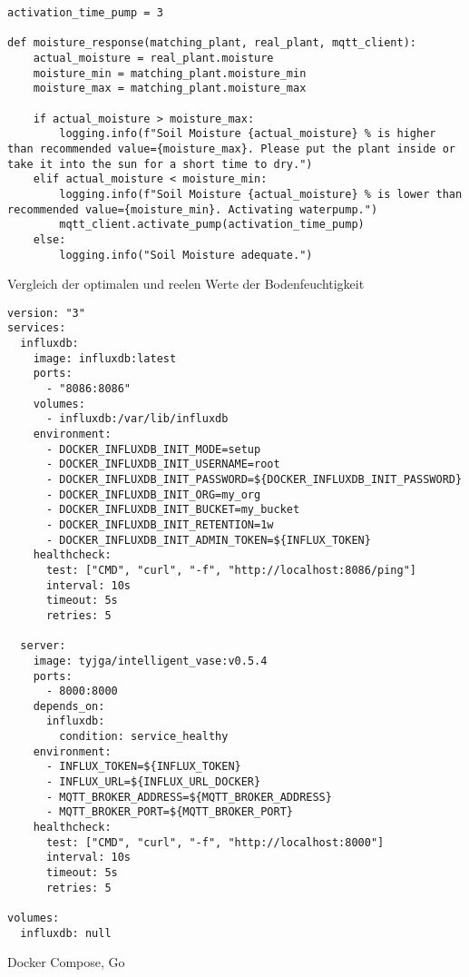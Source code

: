 \begin{longlisting}
\begin{verbatim}
activation_time_pump = 3

def moisture_response(matching_plant, real_plant, mqtt_client):
    actual_moisture = real_plant.moisture
    moisture_min = matching_plant.moisture_min
    moisture_max = matching_plant.moisture_max

    if actual_moisture > moisture_max:
        logging.info(f"Soil Moisture {actual_moisture} % is higher than recommended value={moisture_max}. Please put the plant inside or take it into the sun for a short time to dry.")
    elif actual_moisture < moisture_min:
        logging.info(f"Soil Moisture {actual_moisture} % is lower than recommended value={moisture_min}. Activating waterpump.")
        mqtt_client.activate_pump(activation_time_pump)
    else:
        logging.info("Soil Moisture adequate.")
\end{verbatim}
\caption{Vergleich der optimalen und reelen Werte der Bodenfeuchtigkeit}\label{cde:applicationService}
\end{longlisting}
\newpage

\begin{longlisting}
\begin{verbatim}
version: "3"
services:
  influxdb:
    image: influxdb:latest
    ports:
      - "8086:8086"
    volumes:
      - influxdb:/var/lib/influxdb
    environment:
      - DOCKER_INFLUXDB_INIT_MODE=setup
      - DOCKER_INFLUXDB_INIT_USERNAME=root
      - DOCKER_INFLUXDB_INIT_PASSWORD=${DOCKER_INFLUXDB_INIT_PASSWORD}
      - DOCKER_INFLUXDB_INIT_ORG=my_org
      - DOCKER_INFLUXDB_INIT_BUCKET=my_bucket
      - DOCKER_INFLUXDB_INIT_RETENTION=1w
      - DOCKER_INFLUXDB_INIT_ADMIN_TOKEN=${INFLUX_TOKEN}
    healthcheck:
      test: ["CMD", "curl", "-f", "http://localhost:8086/ping"]
      interval: 10s
      timeout: 5s
      retries: 5

  server:
    image: tyjga/intelligent_vase:v0.5.4
    ports:
      - 8000:8000
    depends_on:
      influxdb:
        condition: service_healthy
    environment:
      - INFLUX_TOKEN=${INFLUX_TOKEN}
      - INFLUX_URL=${INFLUX_URL_DOCKER}
      - MQTT_BROKER_ADDRESS=${MQTT_BROKER_ADDRESS}
      - MQTT_BROKER_PORT=${MQTT_BROKER_PORT}
    healthcheck:
      test: ["CMD", "curl", "-f", "http://localhost:8000"]
      interval: 10s
      timeout: 5s
      retries: 5

volumes:
  influxdb: null

\end{verbatim}
\caption{Docker Compose, Go}\label{cde:applicationService}
\end{longlisting}
\newpage

